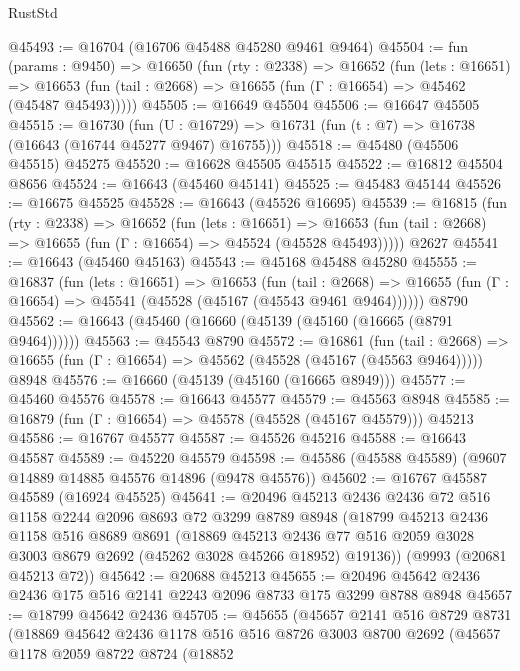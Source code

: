 \begin{lexlean}{RustStd}
\begin{coremodule}
@45493 := @16704 (@16706 @45488 @45280 @9461 @9464)
@45504 := fun (params : @9450) =>
  @16650
    (fun (rty : @2338) =>
    @16652
      (fun (lets : @16651) =>
      @16653 (fun (tail : @2668) => @16655 (fun (Γ : @16654) => @45462 (@45487 @45493)))))
@45505 := @16649 @45504
@45506 := @16647 @45505
@45515 := @16730
    (fun (U : @16729) => @16731 (fun (t : @7) => @16738 (@16643 (@16744 @45277 @9467) @16755)))
@45518 := @45480 (@45506 @45515) @45275
@45520 := @16628 @45505 @45515
@45522 := @16812 @45504 @8656
@45524 := @16643 (@45460 @45141)
@45525 := @45483 @45144
@45526 := @16675 @45525
@45528 := @16643 (@45526 @16695)
@45539 := @16815
    (fun (rty : @2338) =>
    @16652
      (fun (lets : @16651) =>
      @16653 (fun (tail : @2668) => @16655 (fun (Γ : @16654) => @45524 (@45528 @45493)))))
    @2627
@45541 := @16643 (@45460 @45163)
@45543 := @45168 @45488 @45280
@45555 := @16837
    (fun (lets : @16651) =>
    @16653
      (fun (tail : @2668) =>
      @16655 (fun (Γ : @16654) => @45541 (@45528 (@45167 (@45543 @9461 @9464))))))
    @8790
@45562 := @16643 (@45460 (@16660 (@45139 (@45160 (@16665 (@8791 @9464))))))
@45563 := @45543 @8790
@45572 := @16861
    (fun (tail : @2668) => @16655 (fun (Γ : @16654) => @45562 (@45528 (@45167 (@45563 @9464)))))
    @8948
@45576 := @16660 (@45139 (@45160 (@16665 @8949)))
@45577 := @45460 @45576
@45578 := @16643 @45577
@45579 := @45563 @8948
@45585 := @16879 (fun (Γ : @16654) => @45578 (@45528 (@45167 @45579))) @45213
@45586 := @16767 @45577
@45587 := @45526 @45216
@45588 := @16643 @45587
@45589 := @45220 @45579
@45598 := @45586 (@45588 @45589) (@9607 @14889 @14885 @45576 @14896 (@9478 @45576))
@45602 := @16767 @45587 @45589 (@16924 @45525)
@45641 := @20496
    @45213
    @2436
    @2436
    @72
    @516
    @1158
    @2244
    @2096
    @8693
    @72
    @3299
    @8789
    @8948
    (@18799
      @45213
      @2436
      @1158
      @516
      @8689
      @8691
      (@18869
        @45213
        @2436
        @77
        @516
        @2059
        @3028
        @3003
        @8679
        @2692
        (@45262 @3028 @45266 @18952)
        @19136))
    (@9993 (@20681 @45213 @72))
@45642 := @20688 @45213
@45655 := @20496 @45642 @2436 @2436 @175 @516 @2141 @2243 @2096 @8733 @175 @3299 @8788 @8948
@45657 := @18799 @45642 @2436
@45705 := @45655
    (@45657
      @2141
      @516
      @8729
      @8731
      (@18869
        @45642
        @2436
        @1178
        @516
        @516
        @8726
        @3003
        @8700
        @2692
        (@45657
          @1178
          @2059
          @8722
          @8724
          (@18852

\end{coremodule}
\end{lexlean}
